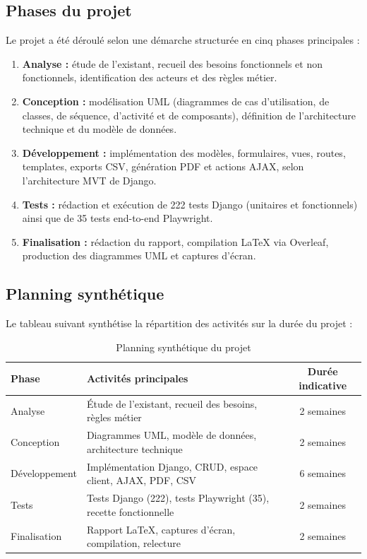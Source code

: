 \subsection{Phases du projet}
Le projet a été déroulé selon une démarche structurée en cinq phases principales :
\begin{enumerate}
  \item \textbf{Analyse :} étude de l'existant, recueil des besoins fonctionnels et non fonctionnels, identification des acteurs et des règles métier.
  \item \textbf{Conception :} modélisation UML (diagrammes de cas d'utilisation, de classes, de séquence, d'activité et de composants), définition de l'architecture technique et du modèle de données.
  \item \textbf{Développement :} implémentation des modèles, formulaires, vues, routes, templates, exports CSV, génération PDF et actions AJAX, selon l'architecture MVT de Django.
  \item \textbf{Tests :} rédaction et exécution de 222 tests Django (unitaires et fonctionnels) ainsi que de 35 tests end-to-end Playwright.
  \item \textbf{Finalisation :} rédaction du rapport, compilation LaTeX via Overleaf, production des diagrammes UML et captures d'écran.
\end{enumerate}

\subsection{Planning synthétique}
Le tableau suivant synthétise la répartition des activités sur la durée du projet :

\begin{table}[H]
\centering
\caption{Planning synthétique du projet}
\begin{tabularx}{\textwidth}{|l|X|c|}
\hline
\textbf{Phase} & \textbf{Activités principales} & \textbf{Durée indicative} \\
\hline
Analyse & Étude de l'existant, recueil des besoins, règles métier & 2 semaines \\
\hline
Conception & Diagrammes UML, modèle de données, architecture technique & 2 semaines \\
\hline
Développement & Implémentation Django, CRUD, espace client, AJAX, PDF, CSV & 6 semaines \\
\hline
Tests & Tests Django (222), tests Playwright (35), recette fonctionnelle & 2 semaines \\
\hline
Finalisation & Rapport LaTeX, captures d'écran, compilation, relecture & 2 semaines \\
\hline
\end{tabularx}
\end{table}


